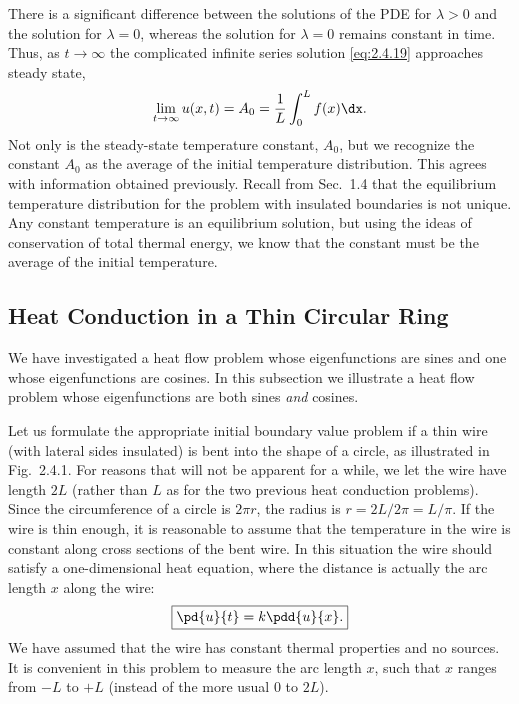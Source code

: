There is a significant difference between the solutions of the PDE for $\lambda > 0$ and the solution for $\lambda = 0$, whereas the solution for $\lambda = 0$ remains constant in time. Thus, as $t \to \infty$ the complicated infinite series solution \eqref{eq:2.4.19} approaches steady state,
\[
\lim_{t\to\infty} u(x,t) = A_0 = \frac{1}{L}\int_0^L f(x)\dx.
\]
Not only is the steady-state temperature constant, $A_0$, but we recognize the constant $A_0$ as the average of the initial temperature distribution. This agrees with information obtained previously. Recall from Sec.~1.4 that the equilibrium temperature distribution for the problem with insulated boundaries is not unique. Any constant temperature is an equilibrium solution, but using the ideas of conservation of total thermal energy, we know that the constant must be the average of the initial temperature.

\subsection{Heat Conduction in a Thin Circular Ring}
\label{sec:2.4.2}

We have investigated a heat flow problem whose eigenfunctions are sines and one whose eigenfunctions are cosines. In this subsection we illustrate a heat flow problem whose eigenfunctions are both sines \emph{and} cosines.

Let us formulate the appropriate initial boundary value problem if a thin wire (with lateral sides insulated) is bent into the shape of a circle, as illustrated in Fig.~2.4.1. For reasons that will not be apparent for a while, we let the wire have length $2L$ (rather than $L$ as for the two previous heat conduction problems). Since the circumference of a circle is $2\pi r$, the radius is $r = 2L/2\pi = L/\pi$. If the wire is thin enough, it is reasonable to assume that the temperature in the wire is constant along cross sections of the bent wire. In this situation the wire should satisfy a one-dimensional heat equation, where the distance is actually the arc length $x$ along the wire:
\begin{equation}
\label{eq:2.4.25}
\boxed{\pd{u}{t} = k\pdd{u}{x}.}
\end{equation}
We have assumed that the wire has constant thermal properties and no sources. It is convenient in this problem to measure the arc length $x$, such that $x$ ranges from $-L$ to $+L$ (instead of the more usual $0$ to $2L$).

